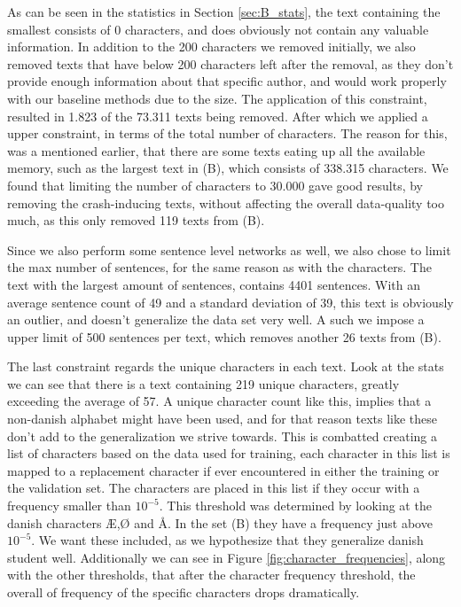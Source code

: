 As can be seen in the statistics in Section \ref{sec:B_stats}, the text
containing the smallest consists of 0 characters, and does obviously not
contain any valuable information. In addition to the 200 characters we removed
initially, we also removed texts that have below 200 characters left after the
removal, as they don't provide enough information about that specific author,
and would work properly with our baseline methods due to the size.
The application of this constraint, resulted in 1.823 of the 73.311 texts
being removed. After which we applied a upper constraint, in terms of the total
number of characters. The reason for this, was a mentioned earlier, that there
are some texts eating up all the available memory, such as the largest text in
(B), which consists of 338.315 characters. We found that limiting the number of
characters to 30.000 gave good results, by removing the crash-inducing texts,
without affecting the overall data-quality too much, as this only removed 119
texts from (B).

Since we also perform some sentence level networks as well, we also chose to
limit the max number of sentences, for the same reason as with the characters.
The text with the largest amount of sentences, contains 4401 sentences. With
an average sentence count of 49 and a standard deviation of 39, this text is
obviously an outlier, and doesn't generalize the data set very well. A such we
impose a upper limit of 500 sentences per text, which removes another 26 texts
from (B).

The last constraint regards the unique characters in each text. Look at the
stats we can see that there is a text containing 219 unique characters, greatly
exceeding the average of 57. A unique character count like this, implies that a
non-danish alphabet might have been used, and for that reason texts like these
don't add to the generalization we strive towards. This is combatted creating a
list of characters based on the data used for training, each character in this
list is mapped to a replacement character if ever encountered in either the
training or the validation set. The characters are placed in this list if they
occur with a frequency smaller than $10^{-5}$. This threshold was determined
by looking at the danish characters Æ,Ø and Å. In the set (B) they have
a frequency just above $10^{-5}$. We want these included, as we hypothesize
that they generalize danish student well. Additionally we can see in Figure
\ref{fig:character_frequencies}, along with the other thresholds, that after
the character frequency threshold, the overall of frequency of the specific
characters drops dramatically.

